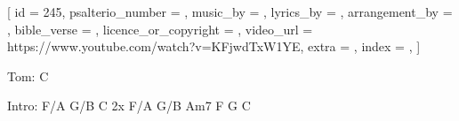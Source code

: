 
[
    id                     = {245},
    psalterio_number       = {},
    music_by               = {},
    lyrics_by              = {},
    arrangement_by         = {},
    bible_verse            = {},
    licence_or_copyright   = {},
    video_url              = {https://www.youtube.com/watch?v=KFjwdTxW1YE},
    extra                  = {},
    index                  = {},
]


\beginchorus

Tom: C

Intro: F/A G/B C 2x
       F/A G/B Am7
       F G C

